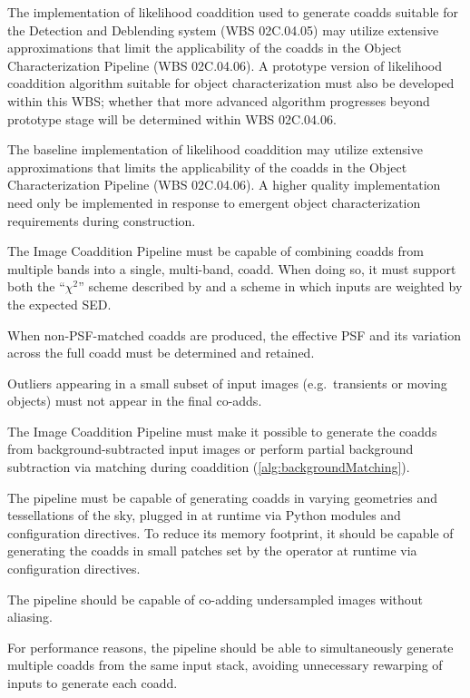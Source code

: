 \documentclass[12pt]{article}
\newcommand{\wbsDetDeblend}{WBS 02C.04.05}
\newcommand{\wbsObjChar}{WBS 02C.04.06}
\begin{document}
The implementation of likelihood coaddition used to generate coadds suitable for the Detection and Deblending system (\wbsDetDeblend{}) may utilize extensive approximations that limit the applicability of the coadds in the Object Characterization Pipeline (\wbsObjChar{}). A prototype version of likelihood coaddition algorithm suitable for object characterization must also be developed within this WBS; whether that more advanced algorithm progresses beyond prototype stage will be determined within \wbsObjChar{}.

The baseline implementation of likelihood coaddition may utilize extensive approximations that limits the applicability of the coadds in the Object Characterization Pipeline (\wbsObjChar). A higher quality implementation need only be implemented in response to emergent object characterization requirements during construction.

The Image Coaddition Pipeline must be capable of combining coadds from multiple bands into a single, multi-band, coadd. When doing so, it must support both the ``$\chi^2$'' scheme described by \cite{Szalay99} and a scheme in which inputs are weighted by the expected SED.

When non-PSF-matched coadds are produced, the effective PSF and its variation across the full coadd must be determined and retained.

Outliers appearing in a small subset of input images (e.g.\ transients or moving objects) must not appear in the final co-adds. %

The Image Coaddition Pipeline must make it possible to generate the coadds from background-subtracted input images or perform partial background subtraction via matching during coaddition (\ref{alg:backgroundMatching}).

The pipeline must be capable of generating coadds in varying geometries and tessellations of the sky, plugged in at runtime via Python modules and configuration directives. To reduce its memory footprint, it should be capable of generating the coadds in small patches set by the operator at runtime via configuration directives.

The pipeline should be capable of co-adding undersampled images without aliasing.

For performance reasons, the pipeline should be able to simultaneously generate multiple coadds from the same input stack, avoiding unnecessary rewarping of inputs to generate each coadd.
\end{document}
